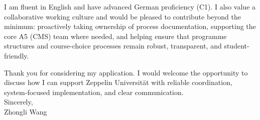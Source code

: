 \documentclass[11pt]{article}
\begin{document}
I am fluent in English and have advanced German proficiency (C1). 
I also value a collaborative working culture and would be pleased to contribute beyond the minimum: proactively taking ownership of process documentation, supporting the core A5 (CMS) team where needed, and helping ensure that programme structures and course-choice processes remain robust, transparent, and student-friendly.

Thank you for considering my application. 
I would welcome the opportunity to discuss how I can support Zeppelin Universität with reliable coordination, system-focused implementation, and clear communication.\\[0.4cm]

\noindent Sincerely,\\[1.2cm]
\noindent Zhongli Wang
\end{document}
